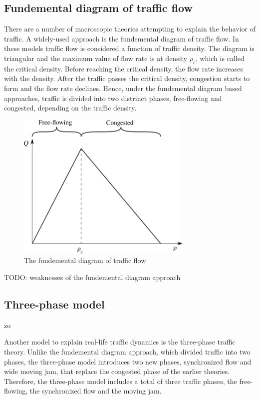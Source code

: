 \documentclass[english, 12pt, a4paper, elec, utf8, pdfa, online]{aaltothesis}
\begin{document}
\subsection{Fundemental diagram of traffic flow}

There are a number of macroscopic theories attempting to explain the behavior of traffic. A widely-used approach is the fundemental diagram of traffic flow. In these models traffic flow is considered a function of traffic density. The diagram is triangular and the maximum value of flow rate is at density $\rho_c$, which is called the critical density. Before reaching the critical density, the flow rate increases with the density. After the traffic passes the critical density, congestion starts to form and the flow rate declines. Hence, under the fundemental diagram based approaches, traffic is divided into two distrinct phases, free-flowing and congested, depending on the traffic density. \cite {lighthillwhitham}

\begin{figure}[h]
    \centering
    \includegraphics[width=0.75\textwidth]{graphs/fund_diagram}
    \caption{The fundemental diagram of traffic flow}
\end{figure}

TODO: weaknesses of the fundemental diagram approach

\subsection{Three-phase model}zo

Another model to explain real-life traffic dynamics is the three-phase traffic theory. Unlike the fundemental diagram approach, which divided traffic into two phases, the three-phase model introduces two new phases, synchronized flow and wide moving jam, that replace the congested phase of the earlier theories. Therefore, the three-phase model includes a total of three traffic phases, the free-flowing, the synchronized flow and the moving jam.
\end{document}
